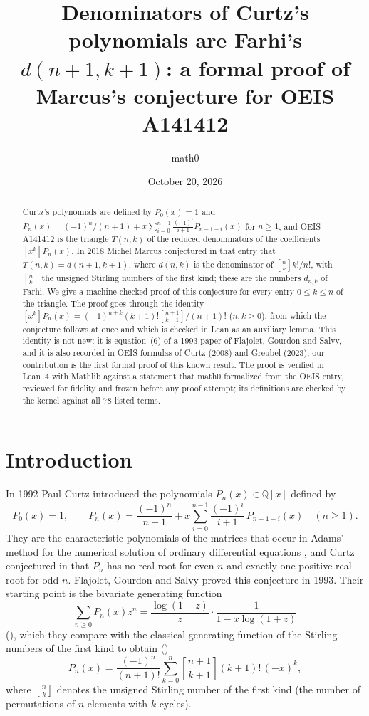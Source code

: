 \documentclass[11pt]{amsart}
\title[Denominators of Curtz's polynomials (OEIS A141412)]{Denominators of Curtz's polynomials are Farhi's $d(n+1,k+1)$: a formal proof of Marcus's conjecture for OEIS A141412}
\author{math0}
\date{October 20, 2026}
\theoremstyle{plain}
\theoremstyle{definition}
\newcommand{\Q}{\mathbb{Q}}
\newcommand{\st}[2]{\genfrac{[}{]}{0pt}{}{#1}{#2}}
\begin{document}
\begin{abstract}
Curtz's polynomials are defined by $P_0(x)=1$ and $P_n(x)=(-1)^n/(n+1)+x\sum_{i=0}^{n-1}\frac{(-1)^i}{i+1}P_{n-1-i}(x)$ for $n\ge1$, and OEIS A141412 is the triangle $T(n,k)$ of the reduced denominators of the coefficients $[x^k]P_n(x)$.
In 2018 Michel Marcus conjectured in that entry that $T(n,k)=d(n+1,k+1)$, where $d(n,k)$ is the denominator of $\st nk k!/n!$, with $\st nk$ the unsigned Stirling numbers of the first kind; these are the numbers $d_{n,k}$ of Farhi.
We give a machine-checked proof of this conjecture for every entry $0\le k\le n$ of the triangle. The proof goes through the identity $[x^k]P_n(x)=(-1)^{n+k}(k+1)!\st{n+1}{k+1}/(n+1)!$ ($n,k\ge0$), from which the conjecture follows at once and which is checked in Lean as an auxiliary lemma.
This identity is not new: it is equation~(6) of a 1993 paper of Flajolet, Gourdon and Salvy, and it is also recorded in OEIS formulas of Curtz (2008) and Greubel (2023); our contribution is the first formal proof of this known result.
The proof is verified in Lean~4 with Mathlib against a statement that math0 formalized from the OEIS entry, reviewed for fidelity and frozen before any proof attempt; its definitions are checked by the kernel against all $78$ listed terms.
\end{abstract}
\maketitle

\section{Introduction}

In 1992 Paul Curtz \cite{Cu92} introduced the polynomials $P_n(x)\in\Q[x]$ defined by
\begin{equation}\label{eq:rec}
  P_0(x)=1,\qquad P_n(x)=\frac{(-1)^n}{n+1}+x\sum_{i=0}^{n-1}\frac{(-1)^i}{i+1}\,P_{n-1-i}(x)\quad(n\ge1).
\end{equation}
They are the characteristic polynomials of the matrices that occur in Adams' method for the numerical solution of ordinary differential equations \cite{FGS}, and Curtz conjectured in \cite{Cu92} that $P_n$ has no real root for even $n$ and exactly one positive real root for odd $n$.
Flajolet, Gourdon and Salvy \cite{FGS} proved this conjecture in 1993.
Their starting point is the bivariate generating function
\begin{equation}\label{eq:fgs3}
  \sum_{n\ge0}P_n(x)z^n=\frac{\log(1+z)}{z}\cdot\frac{1}{1-x\log(1+z)}
\end{equation}
(\cite[eq.~(3)]{FGS}), which they compare with the classical generating function of the Stirling numbers of the first kind \cite{Co74} to obtain (\cite[eq.~(6)]{FGS})
\begin{equation}\label{eq:fgs6}
  P_n(x)=\frac{(-1)^n}{(n+1)!}\sum_{k=0}^{n}\st{n+1}{k+1}(k+1)!\,(-x)^k ,
\end{equation}
where $\st nk$ denotes the unsigned Stirling number of the first kind (the number of permutations of $n$ elements with $k$ cycles).
\end{document}
